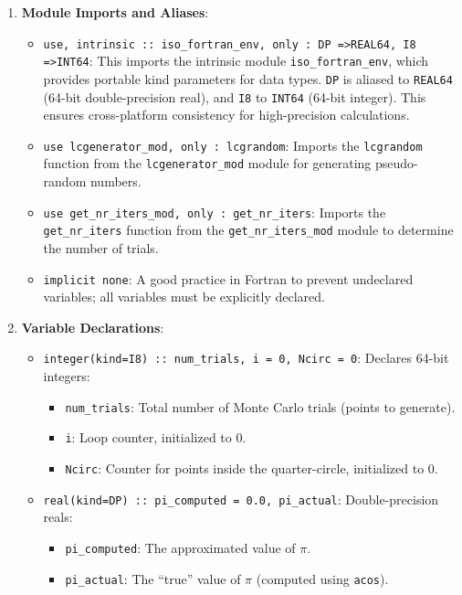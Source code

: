 \begin{enumerate}
\item \textbf{Module Imports and Aliases}:

\begin{itemize}
\item \texttt{use, intrinsic :: iso\_fortran\_env, only : DP =\textgreater  REAL64, I8 =\textgreater  INT64}: This imports the intrinsic module \texttt{iso\_fortran\_env}, which provides portable kind parameters for data types. \texttt{DP} is aliased to \texttt{REAL64} (64-bit double-precision real), and \texttt{I8} to \texttt{INT64} (64-bit integer). This ensures cross-platform consistency for high-precision calculations.
\item \texttt{use lcgenerator\_mod, only : lcgrandom}: Imports the \texttt{lcgrandom} function from the \texttt{lcgenerator\_mod} module for generating pseudo-random numbers.
\item \texttt{use get\_nr\_iters\_mod, only : get\_nr\_iters}: Imports the \texttt{get\_nr\_iters} function from the \texttt{get\_nr\_iters\_mod} module to determine the number of trials.
\item \texttt{implicit none}: A good practice in Fortran to prevent undeclared variables; all variables must be explicitly declared.
\end{itemize}


\item \textbf{Variable Declarations}:

\begin{itemize}
\item \texttt{integer(kind=I8) :: num\_trials, i = 0, Ncirc = 0}: Declares 64-bit integers:

\begin{itemize}
\item \texttt{num\_trials}: Total number of Monte Carlo trials (points to generate).
\item \texttt{i}: Loop counter, initialized to 0.
\item \texttt{Ncirc}: Counter for points inside the quarter-circle, initialized to 0.
\end{itemize}


\item \texttt{real(kind=DP) :: pi\_computed = 0.0, pi\_actual}: Double-precision reals:

\begin{itemize}
\item \texttt{pi\_computed}: The approximated value of $\pi$.
\item \texttt{pi\_actual}: The ``true'' value of $\pi$ (computed using \texttt{acos}).
\end{itemize}



\end{itemize}
\end{enumerate}
